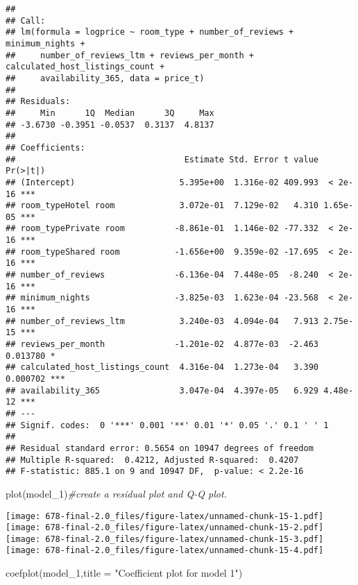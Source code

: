 \documentclass[
]{article}
\newenvironment{Shaded}{\begin{snugshade}}{\end{snugshade}}
\newcommand{\AttributeTok}[1]{\textcolor[rgb]{0.77,0.63,0.00}{#1}}
\newcommand{\CommentTok}[1]{\textcolor[rgb]{0.56,0.35,0.01}{\textit{#1}}}
\newcommand{\FunctionTok}[1]{\textcolor[rgb]{0.00,0.00,0.00}{#1}}
\newcommand{\NormalTok}[1]{#1}
\newcommand{\StringTok}[1]{\textcolor[rgb]{0.31,0.60,0.02}{#1}}
\begin{document}
\begin{verbatim}
## 
## Call:
## lm(formula = logprice ~ room_type + number_of_reviews + minimum_nights + 
##     number_of_reviews_ltm + reviews_per_month + calculated_host_listings_count + 
##     availability_365, data = price_t)
## 
## Residuals:
##     Min      1Q  Median      3Q     Max 
## -3.6730 -0.3951 -0.0537  0.3137  4.8137 
## 
## Coefficients:
##                                  Estimate Std. Error t value Pr(>|t|)    
## (Intercept)                     5.395e+00  1.316e-02 409.993  < 2e-16 ***
## room_typeHotel room             3.072e-01  7.129e-02   4.310 1.65e-05 ***
## room_typePrivate room          -8.861e-01  1.146e-02 -77.332  < 2e-16 ***
## room_typeShared room           -1.656e+00  9.359e-02 -17.695  < 2e-16 ***
## number_of_reviews              -6.136e-04  7.448e-05  -8.240  < 2e-16 ***
## minimum_nights                 -3.825e-03  1.623e-04 -23.568  < 2e-16 ***
## number_of_reviews_ltm           3.240e-03  4.094e-04   7.913 2.75e-15 ***
## reviews_per_month              -1.201e-02  4.877e-03  -2.463 0.013780 *  
## calculated_host_listings_count  4.316e-04  1.273e-04   3.390 0.000702 ***
## availability_365                3.047e-04  4.397e-05   6.929 4.48e-12 ***
## ---
## Signif. codes:  0 '***' 0.001 '**' 0.01 '*' 0.05 '.' 0.1 ' ' 1
## 
## Residual standard error: 0.5654 on 10947 degrees of freedom
## Multiple R-squared:  0.4212, Adjusted R-squared:  0.4207 
## F-statistic: 885.1 on 9 and 10947 DF,  p-value: < 2.2e-16
\end{verbatim}

\begin{Shaded}
\begin{Highlighting}[]
\FunctionTok{plot}\NormalTok{(model\_1)}\CommentTok{\#create a residual plot and Q{-}Q plot.}
\end{Highlighting}
\end{Shaded}

\texttt{[image: 678-final-2.0\_files/figure-latex/unnamed-chunk-15-1.pdf]}
\texttt{[image: 678-final-2.0\_files/figure-latex/unnamed-chunk-15-2.pdf]}
\texttt{[image: 678-final-2.0\_files/figure-latex/unnamed-chunk-15-3.pdf]}
\texttt{[image: 678-final-2.0\_files/figure-latex/unnamed-chunk-15-4.pdf]}

\begin{Shaded}
\begin{Highlighting}[]
\FunctionTok{coefplot}\NormalTok{(model\_1,}\AttributeTok{title =} \StringTok{"Coefficient plot for model 1"}\NormalTok{)}
\end{Highlighting}
\end{Shaded}
\end{document}
